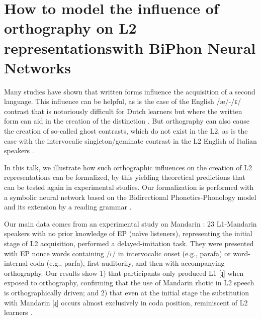 \chapter{How to model the influence of orthography on L2 representationswith BiPhon Neural Networks}\label{ch:silke}
\begin{affils}
\end{affils}

\noindent 
Many studies have shown that written forms influence the acquisition of a second language. 
This influence can be helpful, as is the case of the English /æ/-/ɛ/ contrast that is notoriously
difficult for Dutch learners but where the written form can aid in the creation of the distinction
\citep{weber2004,escudero2010}.
But orthography can also cause the
creation of so-called ghost contrasts, which do not exist in the L2, as is the case with the
intervocalic singleton/geminate contrast in the L2 English of Italian speakers \citep{bassetti2017,hamann2018}.

In this talk, we illustrate how such orthographic influences on the creation of L2
representations can be formalized, by this yielding theoretical predictions that can be tested
again in experimental studies. Our formalization is performed with a symbolic neural network
based on the Bidirectional Phonetics-Phonology model \citep{boersma2007} and its extension by a
reading grammar \citep{hamann2017}.

Our main data comes from an experimental study on Mandarin \citep{zhou2020}: 23
L1-Mandarin speakers with no prior knowledge of EP (naïve listeners), representing the initial
stage of L2 acquisition, performed a delayed-imitation task. They were presented with EP
nonce words containing /ɾ/ in intervocalic onset (e.g., parafa) or word-internal coda (e.g.,
parfa), first auditorily, and then with accompanying orthography. Our results show 1) that
participants only produced L1 [ɻ] when exposed to orthography, confirming that the use of
Mandarin rhotic in L2 speech is orthographically driven; and 2) that even at the initial stage
the substitution with Mandarin [ɻ] occurs almost exclusively in coda position, reminiscent of
L2 learners \citep{zhou2017,liu2018}.





